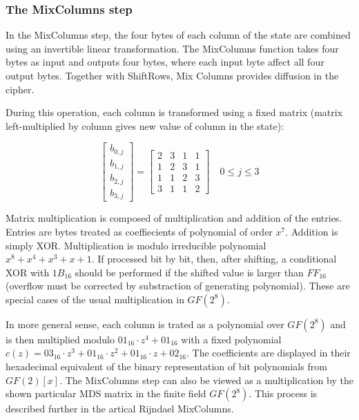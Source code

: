 \documentclass[11pt]{article}
\begin{document}
\subsubsection{The MixColumns step}

In the MixColumns step, the four bytes of each column of the state are combined using an invertible linear transformation. The MixColumns function takes four bytes as input and outputs four bytes, where each input byte affect all four output bytes. Together with ShiftRows, Mix Columns provides diffusion in the cipher.

During this operation, each column is transformed using a fixed matrix (matrix left-multiplied by column gives new value of column in the state):

$$
\begin{bmatrix}
b_{0, j} \\
b_{1, j} \\
b_{2, j} \\
b_{3, j}
\end{bmatrix}
=
\begin{bmatrix}
2 & 3 & 1 & 1 \\
1 & 2 & 3 & 1 \\
1 & 1 & 2 & 3 \\
3 & 1 & 1 & 2 
\end{bmatrix}
\quad
0 \leq j \leq 3
$$

Matrix multiplication is composed of multiplication and addition of the entries. Entries are bytes treated as coeffiecients of polynomial of order $x^7$. Addition is simply XOR. Multiplication is modulo irreducible polynomial $x^8 + x^4 + x^3 + x + 1$. If processed bit by bit, then, after shifting, a conditional XOR with $1B_{16}$ should be performed if the shifted value is larger than $FF_{16}$ (overflow must be corrected by substraction of generating polynomial). These are special cases of the usual multiplication in $GF(2^8)$.

In more general sense, each column is trated as a polynomial over $GF(2^8)$ and is then multiplied modulo $01_{16} \cdot z^4 + 01_{16}$ with a fixed polynomial $c(z) = 03_{16} \cdot z^3 + 01_{16} \cdot z^2 + 01_{16} \cdot z + 02_{16}$. The coefficients are displayed in their hexadecimal equivalent of the binary representation of bit polynomials from $GF(2)[x]$. The MixColumns step can also be viewed as a multiplication by the shown particular MDS matrix in the finite field $GF(2^8)$. This process is described further in the artical Rijndael MixColumns.
\end{document}
